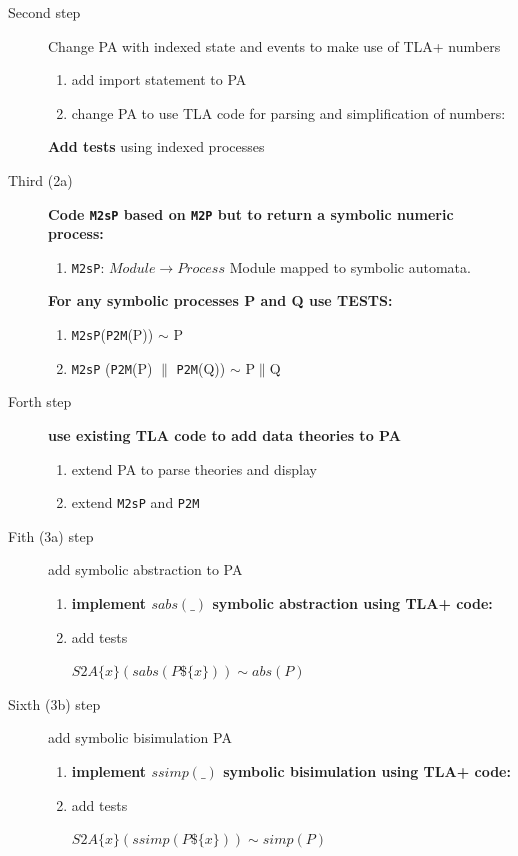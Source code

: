 \documentclass[]{article}
\begin{document}
\begin{description}
\item [Second step]  Change PA with indexed state and events   to make use of TLA+ numbers
\begin{enumerate}
 \item add import statement to PA
 \item{change  PA  to use  TLA code for parsing and  simplification of numbers:}

\end{enumerate}

 {\bf Add tests} using indexed processes

\item [Third  (2a) ]{\bf Code   \verb|M2sP| based on \verb|M2P| but to return a symbolic numeric process: }
\begin{enumerate}
\item \verb|M2sP|: $Module \rightarrow Process $ Module mapped to symbolic  automata.

\end{enumerate}
 {\bf For any symbolic processes P and Q use TESTS:  }
    \begin{enumerate}
    \item  \verb|M2sP|(\verb|P2M|(P)) $\sim$ P
    \item  \verb|M2sP| (\verb|P2M|(P) $\parallel$ \verb|P2M|(Q)) $\sim$ P$\parallel$Q
    \end{enumerate}

\item [Forth step]  {\bf use existing TLA code to add data theories to PA }
\begin{enumerate}
 \item extend   PA to parse theories and display
 \item extend  \verb|M2sP| and \verb|P2M|
\end{enumerate}

\item [Fith (3a) step]  add symbolic abstraction to  PA
\begin{enumerate}
 \item{\bf  implement $sabs(\_)$ symbolic abstraction  using TLA+ code: }
 \item add tests

 $S2A\{x\}(sabs(P\$\{x\})) \sim abs(P)$
\end{enumerate}

\item [Sixth (3b) step]  add symbolic bisimulation   PA
\begin{enumerate}
 \item{\bf  implement $ssimp(\_)$ symbolic bisimulation  using TLA+ code: }
 \item add tests

 $S2A\{x\}(ssimp(P\$\{x\})) \sim simp(P)$
\end{enumerate}

\end{description}
\end{document}
